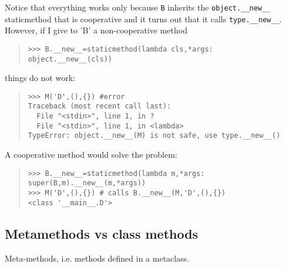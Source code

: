 \documentclass[10pt,english]{article}
\begin{document}
Notice that everything works 
only because \texttt{B} inherits the \texttt{object.{\_}{\_}new{\_}{\_}} staticmethod that 
is cooperative and it turns out that it calls \texttt{type.{\_}{\_}new{\_}{\_}}. However, 
if I give to 'B' a non-cooperative method
\begin{quote}
\begin{verbatim}>>> B.__new__=staticmethod(lambda cls,*args: object.__new__(cls))\end{verbatim}
\end{quote}

things do not work:
\begin{quote}
\begin{verbatim}>>> M('D',(),{}) #error
Traceback (most recent call last):
  File "<stdin>", line 1, in ?
  File "<stdin>", line 1, in <lambda>
TypeError: object.__new__(M) is not safe, use type.__new__()\end{verbatim}
\end{quote}

A cooperative method would solve the problem:
\begin{quote}
\begin{verbatim}>>> B.__new__=staticmethod(lambda m,*args: super(B,m).__new__(m,*args))
>>> M('D',(),{}) # calls B.__new__(M,'D',(),{})
<class '__main__.D'>\end{verbatim}
\end{quote}



\hypertarget{metamethods-vs-class-methods}{}
\subsection*{Metamethods vs class methods}

Meta-methods, i.e. methods defined in
a metaclass.
\end{document}
